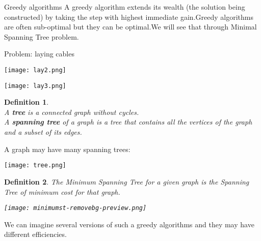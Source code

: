 \documentclass[10pt]{report}
\makeatletter
\numberwithin{dummy}{section}
\theoremstyle{ocrenumbox}
\theoremstyle{grayman}
\newtheorem{definitionTTTT}{Definition}[]
\newenvironment{voc}{\begin{vBox}\begin{definitionTTTT}}{\end{definitionTTTT}\end{vBox}}
\renewcommand{\section}{\@startsection{section}{1}{\z@}
{-4ex \@plus -1ex \@minus -.4ex}
{1ex \@plus.2ex }
{\normalfont\large\sffamily\bfseries}}
\makeatother
\begin{document}
\section{Greedy algorithms}
A greedy algorithm extends its wealth (the solution
being constructed) by taking the step with highest
immediate gain.Greedy algorithms are often sub-optimal but they can be optimal.We will see that through Minimal
Spanning Tree problem.
\begin{center}
Problem: laying cables
\end{center}
\begin{minipage}{0.5\textwidth}
    \begin{center}
        \texttt{[image: lay2.png]}
    \end{center}
\end{minipage}
\begin{minipage}{0.5\textwidth}
    \begin{center}
        \texttt{[image: lay3.png]}
    \end{center}
\end{minipage}
\begin{voc}\phantom{a}\\
A \textbf{tree} is a connected graph without cycles.\\
A \textbf{spanning tree} of a graph is a tree that contains all the vertices of the graph and a subset of its edges.
\end{voc}
A graph may have many spanning trees:
\begin{center}
    \texttt{[image: tree.png]}
\end{center}
\begin{voc}
The Minimum Spanning Tree for a given graph is the
Spanning Tree of minimum cost for that graph.
\begin{center}
    \texttt{[image: minimumst-removebg-preview.png]}
\end{center}

\end{voc}
We can imagine several versions of such a greedy
algorithms and they may have different efficiencies.
\end{document}
